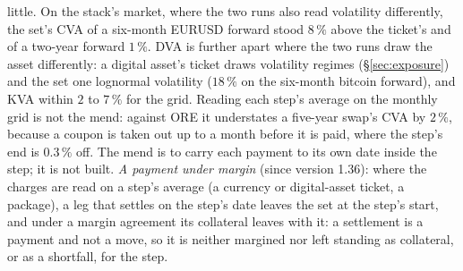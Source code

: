 \documentclass[11pt,a4paper]{article}
\begin{document}
little. On the stack's market, where the two runs also read volatility differently, the set's CVA of a six-month EURUSD forward stood $8\,\%$ above the ticket's and of a two-year forward $1\,\%$. DVA is further apart where the two runs draw the asset differently: a digital asset's ticket draws volatility regimes (\S\ref{sec:exposure}) and the set one lognormal volatility ($18\,\%$ on the six-month bitcoin forward), and KVA within $2$ to $7\,\%$ for the grid. Reading each step's average on the monthly grid is not the mend: against ORE it understates a five-year swap's CVA by $2\,\%$, because a coupon is taken out up to a month before it is paid, where the step's end is $0.3\,\%$ off. The mend is to carry each payment to its own date inside the step; it is not built. \emph{A payment under margin} (since version 1.36): where the charges are read on a step's average (a currency or digital-asset ticket, a package), a leg that settles on the step's date leaves the set at the step's start, and under a margin agreement its collateral leaves with it: a settlement is a payment and not a move, so it is neither margined nor left standing as collateral, or as a shortfall, for the step.
\end{document}
